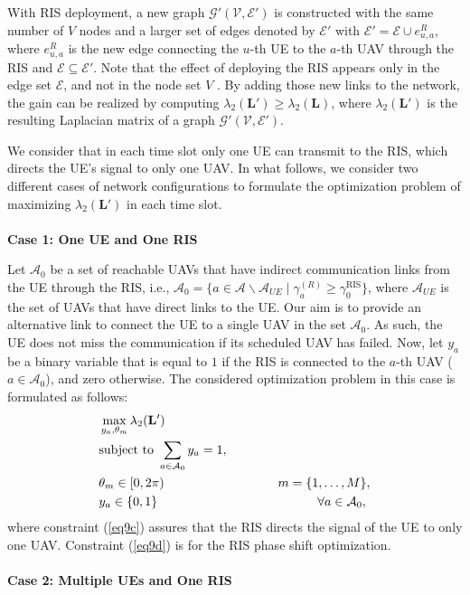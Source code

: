 \documentclass[conference]{IEEEtran}
\begin{document}
With RIS deployment, a new graph $\mathcal G'(\mathcal V, \mathcal E')$ is constructed with the same number of $V$ nodes and a larger set of edges denoted by $\mathcal E'$ with $\mathcal E'=\mathcal E \cup e^{R}_{u,a}$, where $e^{R}_{u,a}$ is the new edge connecting the $u$-th UE to the $a$-th UAV through the RIS and $\mathcal E \subseteq \mathcal E'$. Note that the effect of deploying the RIS appears only in the edge set $\mathcal E$, and  not in the node set $V$ \cite{8292633, 4657335, 4786516}. By adding those new links to the network, the gain can be realized by computing $\lambda_2 (\mathbf L') \geq \lambda_2 (\mathbf L)$, where $\lambda_2 (\mathbf L')$ is the resulting Laplacian matrix of a graph $\mathcal G'(\mathcal V, \mathcal E')$.


We  consider that in each time slot only one UE can transmit to the RIS, which directs the UE's signal to only one UAV. In what follows, we consider two different cases of network configurations to formulate the optimization problem of maximizing $\lambda_2 (\mathbf L')$ in each time slot.\\\\
\textbf{Case 1: One UE and One RIS}

Let $\mathcal A_0$ be a set of reachable UAVs that have indirect communication links from the UE through the RIS, i.e., $\mathcal A_0 =\{a\in \mathcal A\backslash \mathcal A_{UE} \mid \gamma^{(R)}_{a} \geq \gamma^\text{RIS}_{0}\}$, where $\mathcal A_{UE}$ is the set of UAVs that have direct links to the UE. Our aim is to provide an alternative link to connect the UE to a single UAV in the set $\mathcal A_0$. As such, the UE does not miss the communication if its scheduled UAV has failed. Now, let $y_a$ be a binary variable that is equal to $1$ if the RIS is connected to the $a$-th UAV ($a \in \mathcal A_0$), and zero otherwise. The considered optimization problem in this case is formulated as follows:
\begin{subequations}
\label{eq9}
\begin{align}
&\max_{\substack{y_a, \theta_m}}  \lambda_2(\mathbf L')
\label{eq9a} \\
 &{\rm subject~to\ } 
\sum_{a \in \mathcal A_0}y_a=1, \label{eq9c}\\
& \theta_m \in [0, 2\pi)~~~~~~~~~~~~~~~~~~~~~~~~~~~ m=\{1, \ldots, M\}, \label{eq9d}\\
& y_a \in \{0, 1 \} ~~~~~~~~~~~~~~~~~~~~~~~~~~~~~~~~~~~~~~\forall a \in \mathcal A_0,
\end{align}
\end{subequations}
where constraint (\ref{eq9c}) assures that the RIS directs the signal of the UE to only one UAV. Constraint (\ref{eq9d}) is for the RIS phase shift optimization.\\ \\
\textbf{Case 2: Multiple UEs and One RIS}
\end{document}
